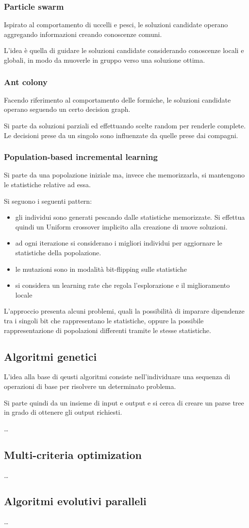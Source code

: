 \documentclass[a4paper]{article}
\begin{document}
\subsubsection{Particle swarm}
Ispirato al comportamento di uccelli e pesci, le soluzioni candidate operano aggregando 
informazioni creando conoscenze comuni.

L'idea è quella di guidare le soluzioni candidate considerando conoscenze locali e 
globali, in modo da muoverle in gruppo verso una soluzione ottima.

\subsubsection{Ant colony}
Facendo riferimento al comportamento delle formiche, le soluzioni candidate 
operano seguendo un certo decision graph. 

Si parte da soluzioni parziali ed effettuando scelte random per 
renderle complete. Le decisioni prese da un singolo 
sono influenzate da quelle prese dai compagni.

\subsubsection{Population-based incremental learning}
Si parte da una popolazione iniziale ma, invece che memorizzarla, 
si mantengono le statistiche relative ad essa.

Si seguono i seguenti pattern:
\begin{itemize}
    \item gli individui sono generati pescando dalle statistiche memorizzate.
    Si effettua quindi un Uniform crossover implicito alla creazione di nuove 
    soluzioni.
    \item ad ogni iterazione si considerano i migliori individui per aggiornare le statistiche
    della popolazione.
    \item le mutazioni sono in modalità bit-flipping sulle statistiche 
    \item si considera un learning rate che regola l'esplorazione e il miglioramento locale
\end{itemize}
L'approccio presenta alcuni problemi, quali la possibilità di imparare dipendenze tra
i singoli bit che rappresentano le statistiche, oppure la possibile rappresentazione 
di popolazioni differenti tramite le stesse statistiche.


\subsection{Algoritmi genetici}
L'idea alla base di qeusti algoritmi consiste nell'individuare 
una sequenza di operazioni di base per risolvere un determinato problema.

Si parte quindi da un insieme di input e output e si cerca di creare un parse 
tree in grado di ottenere gli output richiesti.

\dots

\subsection{Multi-criteria optimization}
\dots
\subsection{Algoritmi evolutivi paralleli}
\dots
\end{document}
